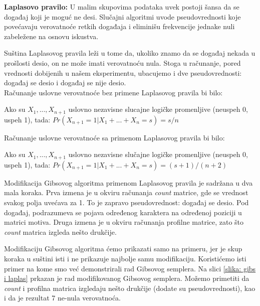 \begin{tcolorbox}
\textbf{Laplasovo pravilo:} U malim skupovima podataka uvek postoji šansa da se događaj koji je moguć ne desi. Slučajni algoritmi uvode pseudovrednosti koje povećavaju verovatnoće retkih događaja i eliminišu frekvencije jednake nuli zabeležene na osnovu iskustva.
\end{tcolorbox}

\indent Suština Laplasovog pravila leži u tome da, ukoliko znamo da se događaj nekada u prošlosti desio, on ne može imati verovatnoću nula. Stoga u računanje, pored vrednosti dobijenih u našem eksperimentu, ubacujemo i dve pseudovrednosti: događaj se desio i događaj se nije desio. \\

\noindent Računanje uslovne verovatnoće bez primene Laplasovog pravila bi bilo:
\begin{tcolorbox}
Ako su $X_1, ..., X_{n+1}$ uslovno nezavisne slucajne logičke promenljive (neuspeh 0, uspeh 1), tada: $Pr(X_{n+1}=1|X_1+...+X_n=s)=s/n$
\end{tcolorbox}

\noindent Računanje uslovne verovatnoće sa primenom Laplasovog pravila bi bilo:
\begin{tcolorbox}
Ako su $X_1, ..., X_{n+1}$ uslovno nezavisne slučajne logičke promenljive (neuspeh 0, uspeh 1), tada: $Pr(X_{n+1}=1|X_1+...+X_n=s)=(s+1)/(n+2)$
\end{tcolorbox}

Modifikacija Gibsovog algoritma primenom Laplasovog pravila je sadržana u dva mala koraka. Prva izmena je u okviru računanja \textit{count} matrice, gde se vrednost svakog polja uvećava za 1. To je zapravo pseudovrednost: događaj se desio. Pod događaj, podrazumeva se pojava određenog karaktera na određenoj poziciji u matrici motiva. Druga izmena je u okviru računanja profilne matrice, zato što \textit{count} matrica izgleda nešto drukčije. 

Modifikaciju Gibsovog algoritma ćemo prikazati samo na primeru, jer je skup koraka u suštini isti i ne prikazuje najbolje samu modifikaciju. Koristićemo isti primer na kome smo već demonstrirali rad Gibsovog semplera. Na slici \ref{slika: gibs i laplas} prkazan je rad modifikovanog Gibsovog semplera. Možemo primetiti da \textit{count} i profilna matrica izgledaju nešto drukčije (dodate su pseudovrednosti), kao i da je rezultat 7 ne-nula verovatnoća.

